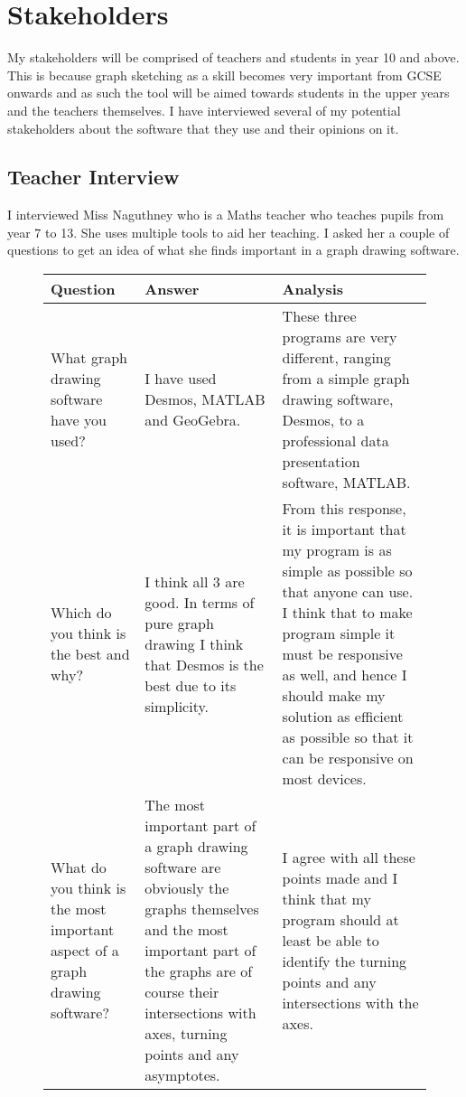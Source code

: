 \documentclass[../../../main.tex]{subfiles}
\begin{document}
\chapter{Stakeholders}
My stakeholders will be comprised of teachers and students in year 10 and above. This is because graph sketching as a skill becomes very important from GCSE onwards and as such the tool will be aimed towards students in the upper years and the teachers themselves. I have interviewed several of my potential stakeholders about the software that they use and their opinions on it. 
\section{Teacher Interview}
I interviewed Miss Naguthney who is a Maths teacher who teaches pupils from year 7 to 13. She uses multiple tools to aid her teaching. I asked her a couple of questions to get an idea of what she finds important in a graph drawing software.

\begin{figure}[H]
\centering
	\begin{tabular}{|L{0.15\textwidth}|m{0.25\textwidth}|L{0.5\textwidth}|}
	\hline
	\Centering Question & \Centering Answer & \Centering Analysis \\
	\hline
	What graph drawing software have you used? & I have used Desmos, MATLAB and GeoGebra. & These three programs are very different, ranging from a simple graph drawing software, Desmos, to a professional data presentation software, MATLAB.
	 \\ \hline
	Which do you think is the best and why? & I think all 3 are good. In terms of pure graph drawing I think
	that Desmos is the best due to its simplicity. & From this response, it is important that my program is as simple as possible so that anyone can use. I think that to make program simple it must be responsive as well, and hence I should make my solution as efficient as possible so that it can be responsive on most devices. \\ \hline
	What do you think is the most important
	aspect of a graph drawing software? & The most important part of a graph drawing software are obviously the graphs themselves and the most important part of the graphs are of course their intersections with axes, turning points and any asymptotes. & I agree with all these points made and I think that my program should at least be able to identify the turning points and any intersections with the axes.\\
	\hline
	\end{tabular}
\end{figure}
\end{document}
